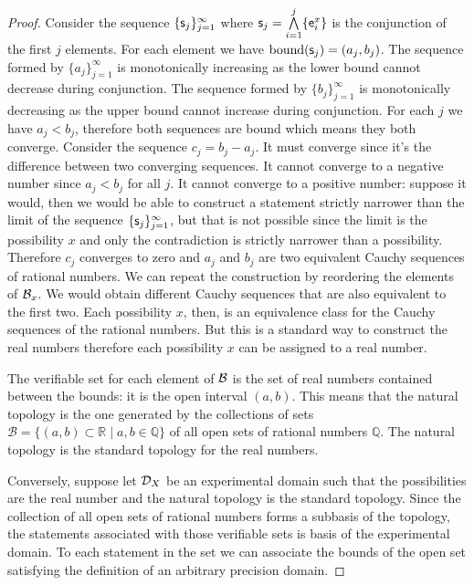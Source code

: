\documentclass[11pt,letterpaper,fleqn]{memoir} %
\begin{document}
\begin{mathSection}
\begin{proof}
		Consider the sequence $\{\stmt_j\}_{j=1}^{\infty}$ where $\stmt_j = \bigAND\limits_{i=1}^j\{\obs[e]^x_i\}$ is the conjunction of the first $j$ elements. For each element we have $\operatorname{bound}(\stmt_j) = (a_j, b_j)$. The sequence formed by $\{a_j\}_{j=1}^{\infty}$ is monotonically increasing as the lower bound cannot decrease during conjunction. The sequence formed by $\{b_j\}_{j=1}^{\infty}$ is monotonically decreasing as the upper bound cannot increase during conjunction. For each $j$ we have $a_j < b_j$, therefore both sequences are bound which means they both converge. Consider the sequence $c_j = b_j - a_j$. It must converge since it's the difference between two converging sequences. It cannot converge to a negative number since $a_j < b_j$ for all $j$. It cannot converge to a positive number: suppose it would, then we would be able to construct a statement strictly narrower than the limit of the sequence $\{\stmt_j\}_{j=1}^{\infty}$, but that is not possible since the limit is the possibility $x$ and only the contradiction is strictly narrower than a possibility. Therefore $c_j$ converges to zero and $a_j$ and $b_j$ are two equivalent Cauchy sequences of rational numbers. We can repeat the construction by reordering the elements of $\basis_x$. We would obtain different Cauchy sequences that are also equivalent to the first two. Each possibility $x$, then, is an equivalence class for the Cauchy sequences of the rational numbers. But this is a standard way to construct the real numbers therefore each possibility $x$ can be assigned to a real number.
		
		The verifiable set for each element of $\basis$ is the set of real numbers contained between the bounds: it is the open interval $(a,b)$. This means that the natural topology is the one generated by the collections of sets $\mathcal{B} = \{ (a,b) \subset \mathbb{R} \; | \; a,b \in \mathbb{Q} \}$ of all open sets of rational numbers $\mathbb{Q}$. The natural topology is the standard topology for the real numbers.
		
		Conversely, suppose let $\edomain_X$ be an experimental domain such that the possibilities are the real number and the natural topology is the standard topology. Since the collection of all open sets of rational numbers forms a subbasis of the topology, the statements associated with those verifiable sets is basis of the experimental domain. To each statement in the set we can associate the bounds of the open set satisfying the definition of an arbitrary precision domain.
	\end{proof}
	

\end{mathSection}
\end{document}
